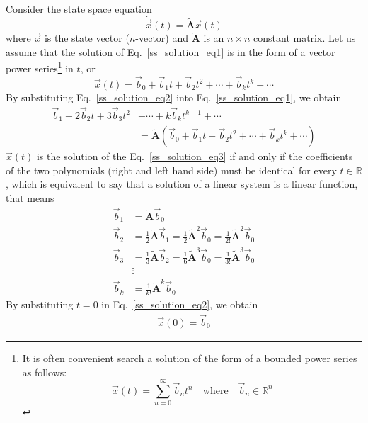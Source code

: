 \documentclass[11pt,a4paper,oneside]{book}
\numberwithin{equation}{section}
\theoremstyle{it}
\theoremstyle{definition}
\begin{document}
Consider the state space equation
\begin{equation}\label{ss_solution_eq1}
	\dot{\vec{x}}(t)=\tilde{\mathbf{A}}\vec{x}(t)
\end{equation}
where $\vec{x}$ is the state vector ($n$-vector) and $\tilde{\mathbf{A}}$ is an 
$n \times n$ constant matrix. Let us assume that the solution of 
Eq.~\eqref{ss_solution_eq1} is in the form of a vector power series\footnote{It 
is often convenient search a solution of the form of a bounded power series as 
follows: $$\vec{x}(t)=\sum_{n=0}^{\infty}\vec{b}_nt^n \quad\text{where} 
\quad\vec{b}_n \in\mathbb{R}^n $$} in $t$, or
\begin{equation}\label{ss_solution_eq2}
	{\vec{x}(t)}=\vec{b}_0+\vec{b}_1t+\vec{b}_2t^2+\cdots+\vec{b}_kt^k+\cdots
\end{equation}
By substituting Eq.~\eqref{ss_solution_eq2} into Eq.~\eqref{ss_solution_eq1}, we obtain 
\begin{equation}\label{ss_solution_eq3}
	\begin{aligned}
		\vec{b}_1+2\vec{b}_2t+3\vec{b}_3t^2&+\cdots+k\vec{b}_kt^{k-1}+\cdots\\[6pt]
		&= \tilde{\mathbf{A}}\left(\vec{b}_0+\vec{b}_1t+\vec{b}_2t^2+\cdots+\vec{b}_kt^k+\cdots\right)
	\end{aligned}
\end{equation}
$\vec{x}(t)$ is the solution of the Eq.~\eqref{ss_solution_eq3} if and only if 
the coefficients of the two polynomials (right and left hand side) must be 
identical for every $t\in\mathbb{R}$, which is equivalent to say that a solution of a linear system is a linear function, that means
\begin{equation}\label{ss_solution_eq4}
	\begin{aligned}
		\vec{b}_1 &= \tilde{\mathbf{A}}\vec{b}_0 \\[6pt]
		\vec{b}_2 &= \frac{1}{2}\tilde{\mathbf{A}}\vec{b}_1 = \frac{1}{2}\tilde{\mathbf{A}}^2\vec{b}_0 = \frac{1}{2!}\tilde{\mathbf{A}}^2\vec{b}_0 \\[6pt]
		\vec{b}_3 &= \frac{1}{3}\tilde{\mathbf{A}}\vec{b}_2 = \frac{1}{6}\tilde{\mathbf{A}}^3\vec{b}_0 = \frac{1}{3!}\tilde{\mathbf{A}}^3\vec{b}_0 \\[6pt]
		&\vdots \\[6pt]
		\vec{b}_k &= \frac{1}{k!}\tilde{\mathbf{A}}^k\vec{b}_0
	\end{aligned}
\end{equation}
By substituting $t=0$ in Eq.~\eqref{ss_solution_eq2}, we obtain 
\begin{equation}\label{ss_solution_eq5}
	\begin{aligned}
		\vec{x}(0) = \vec{b}_0
	\end{aligned}
\end{equation}
\end{document}
